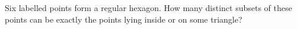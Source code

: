 Six labelled points form a regular hexagon. How many distinct subsets of these points can be exactly the points lying inside or on some triangle?
